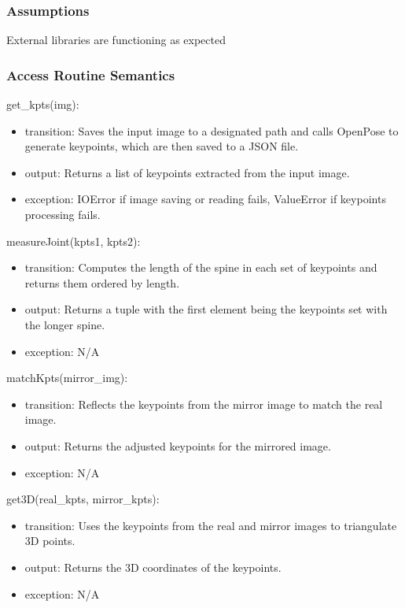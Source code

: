 \documentclass[12pt, titlepage]{article}
\begin{document}
\subsubsection{Assumptions}
External libraries are functioning as expected

\subsubsection{Access Routine Semantics}
\noindent get\_kpts(img):
\begin{itemize}
  \item transition: Saves the input image to a designated path and calls OpenPose to generate keypoints, which are then saved to a JSON file.
  \item output: Returns a list of keypoints extracted from the input image.
  \item exception: IOError if image saving or reading fails, ValueError if keypoints processing fails.
\end{itemize}

\noindent measureJoint(kpts1, kpts2):
\begin{itemize}
  \item transition: Computes the length of the spine in each set of keypoints and returns them ordered by length.
  \item output: Returns a tuple with the first element being the keypoints set with the longer spine.
  \item exception: N/A
\end{itemize}

\noindent matchKpts(mirror\_img):
\begin{itemize}
  \item transition: Reflects the keypoints from the mirror image to match the real image.
  \item output: Returns the adjusted keypoints for the mirrored image.
  \item exception: N/A
\end{itemize}

\noindent get3D(real\_kpts, mirror\_kpts):
\begin{itemize}
  \item transition: Uses the keypoints from the real and mirror images to triangulate 3D points.
  \item output: Returns the 3D coordinates of the keypoints.
  \item exception: N/A
\end{itemize}
\end{document}
